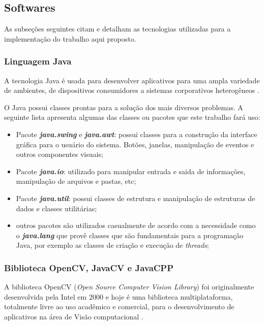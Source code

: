 \subsection{Softwares}\label{sub-softw}
As subseções seguintes citam e detalham as tecnologias utilizadas para a implementação do trabalho aqui proposto.

\subsubsection{Linguagem Java}\label{subsec:java}
A tecnologia Java é usada para desenvolver aplicativos para uma ampla variedade de ambientes, de dispositivos consumidores a sistemas corporativos heterogêneos \cite{ibm_java}. 

O Java possui classes prontas para a solução dos mais diversos problemas. A seguinte lista apresenta algumas das classes ou pacotes que este trabalho fará uso:

\begin{itemize}
	
	\item Pacote \textbf{\textit{java.swing}} e \textbf{\textit{java.awt}}: possui classes para a construção da interface gráfica para o usuário do sistema. Botões, janelas, manipulação de eventos e outros componentes visuais;
	
	\item Pacote \textbf{\textit{java.io}}: utilizado para manipular entrada e saida de informações, manipulação de arquivos e pastas, etc;
	
	\item Pacote \textbf{\textit{java.util}}: possui classes de estrutura e manipulação de estruturas de dados e classes utilitárias;
	
	\item outros pacotes são utilizados casualmente de acordo com a necessidade como o \textbf{\textit{java.lang}} que provê classes que são fundamentais para a programação Java, por exemplo as classes de criação e execução de \textit{threads};	
	
\end{itemize}

\subsubsection{Biblioteca OpenCV, JavaCV e JavaCPP}\label{subsec:bib_opencv}

A biblioteca OpenCV (\textit{Open Source Computer Vision Library}) foi originalmente desenvolvida pela Intel em 2000 e hoje é uma biblioteca multiplataforma, totalmente livre ao uso acadêmico e comercial, para o desenvolvimento de aplicativos na área de Visão computacional \cite{opencv}.


